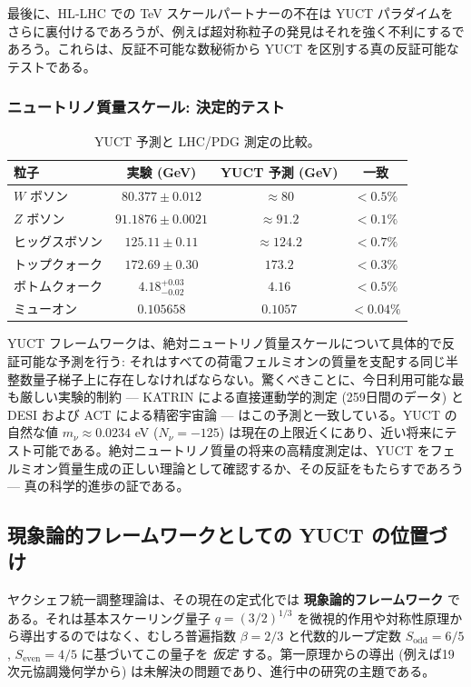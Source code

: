 \documentclass[11pt,a4paper]{article}
\theoremstyle{remark}
\begin{document}
	最後に、HL‑LHC での TeV スケールパートナーの不在は YUCT パラダイムをさらに裏付けるであろうが、例えば超対称粒子の発見はそれを強く不利にするであろう。これらは、反証不可能な数秘術から YUCT を区別する真の反証可能なテストである。
	
	\subsubsection{ニュートリノ質量スケール: 決定的テスト}
	\begin{table}[h]
		\centering
		\caption{YUCT 予測と LHC/PDG 測定の比較。}
		\normalsize
		\label{tab:lhc_comparison}
		\begin{tabular}{l c c c}
			\toprule
			粒子 & 実験 (GeV) & YUCT 予測 (GeV) & 一致 \\
			\midrule
			$W$ ボソン  & $80.377 \pm 0.012$ & $\approx 80$ & $<0.5\%$ \\
			$Z$ ボソン  & $91.1876 \pm 0.0021$ & $\approx 91.2$ & $<0.1\%$ \\
			ヒッグスボソン & $125.11 \pm 0.11$ & $\approx 124.2$ & $<0.7\%$ \\
			トップクォーク  & $172.69 \pm 0.30$ & $173.2$ & $<0.3\%$ \\
			ボトムクォーク & $4.18^{+0.03}_{-0.02}$ & $4.16$ & $<0.5\%$ \\
			ミューオン       & $0.105658$ & $0.1057$ & $<0.04\%$ \\
			\bottomrule
		\end{tabular}
	\end{table}
	
	YUCT フレームワークは、絶対ニュートリノ質量スケールについて具体的で反証可能な予測を行う: それはすべての荷電フェルミオンの質量を支配する同じ半整数量子梯子上に存在しなければならない。驚くべきことに、今日利用可能な最も厳しい実験的制約 — KATRIN による直接運動学的測定 (259日間のデータ) と DESI および ACT による精密宇宙論 — はこの予測と一致している。YUCT の自然な値 $m_\nu \approx 0.0234$ eV ($N_\nu = -125$) は現在の上限近くにあり、近い将来にテスト可能である。絶対ニュートリノ質量の将来の高精度測定は、YUCT をフェルミオン質量生成の正しい理論として確認するか、その反証をもたらすであろう — 真の科学的進歩の証である。
	
	\subsection*{現象論的フレームワークとしての YUCT の位置づけ}
	
	ヤクシェフ統一調整理論は、その現在の定式化では \textbf{現象論的フレームワーク} である。それは基本スケーリング量子 \(q = (3/2)^{1/3}\) を微視的作用や対称性原理から導出するのではなく、むしろ普遍指数 \(\beta = 2/3\) と代数的ループ定数 \(S_{\mathrm{odd}}=6/5\), \(S_{\mathrm{even}}=4/5\) に基づいてこの量子を \emph{仮定} する。第一原理からの導出 (例えば19次元協調幾何学から) は未解決の問題であり、進行中の研究の主題である。
	
\end{document}
